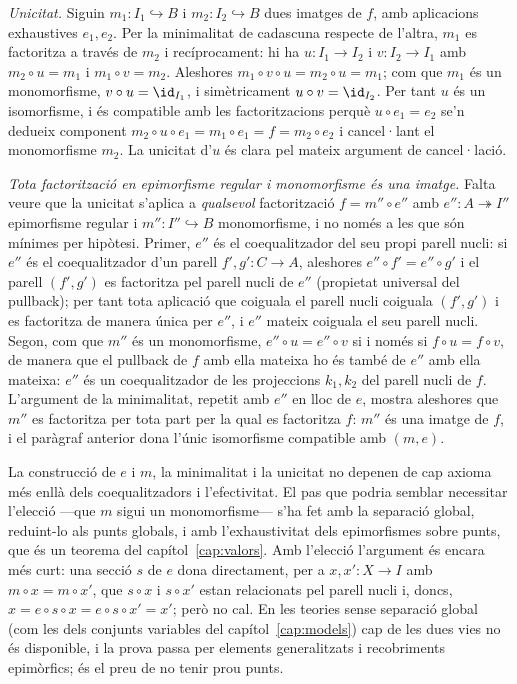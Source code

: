 \begin{prova}
\emph{Unicitat.} Siguin \(m_1\colon I_1\hookrightarrow B\) i
\(m_2\colon I_2\hookrightarrow B\) dues imatges de \(f\), amb aplicacions
exhaustives \(e_1,e_2\). Per la minimalitat de cadascuna respecte de
l'altra, \(m_1\) es factoritza a través de \(m_2\) i recíprocament: hi ha
\(u\colon I_1\to I_2\) i \(v\colon I_2\to I_1\) amb \(m_2\circ u=m_1\) i
\(m_1\circ v=m_2\). Aleshores \(m_1\circ v\circ u=m_2\circ u=m_1\); com
que \(m_1\) és un monomorfisme, \(v\circ u=\id_{I_1}\), i simètricament
\(u\circ v=\id_{I_2}\). Per tant \(u\) és un isomorfisme, i és compatible
amb les factoritzacions perquè \(u\circ e_1=e_2\) se'n dedueix component
\(m_2\circ u\circ e_1=m_1\circ e_1=f=m_2\circ e_2\) i cancel·lant el
monomorfisme \(m_2\). La unicitat d'\(u\) és clara pel mateix argument de
cancel·lació.

\emph{Tota factorització en epimorfisme regular i monomorfisme és una
imatge.} Falta veure que la unicitat s'aplica a \emph{qualsevol}
factorització \(f=m''\circ e''\) amb \(e''\colon A\twoheadrightarrow I''\)
epimorfisme regular i \(m''\colon I''\hookrightarrow B\) monomorfisme, i no
només a les que són mínimes per hipòtesi. Primer, \(e''\) és el
coequalitzador del seu propi parell nucli: si \(e''\) és el coequalitzador
d'un parell \(f',g'\colon C\to A\), aleshores \(e''\circ f'=e''\circ g'\) i
el parell \((f',g')\) es factoritza pel parell nucli de \(e''\) (propietat
universal del pullback); per tant tota aplicació que coiguala el parell
nucli coiguala \((f',g')\) i es factoritza de manera única per \(e''\), i
\(e''\) mateix coiguala el seu parell nucli. Segon, com que \(m''\) és un
monomorfisme, \(e''\circ u=e''\circ v\) si i només si \(f\circ u=f\circ v\),
de manera que el pullback de \(f\) amb ella mateixa ho és també de \(e''\)
amb ella mateixa: \(e''\) és un coequalitzador de les projeccions
\(k_1,k_2\) del parell nucli de \(f\). L'argument de la minimalitat,
repetit amb \(e''\) en lloc de \(e\), mostra aleshores que \(m''\) es
factoritza per tota part per la qual es factoritza \(f\): \(m''\) és una
imatge de \(f\), i el paràgraf anterior dona l'únic isomorfisme compatible
amb \((m,e)\).
\end{prova}

\begin{observacio}\label{obs:factoritzacio-eleccio}
La construcció de \(e\) i \(m\), la minimalitat i la unicitat no depenen
de cap axioma més enllà dels coequalitzadors i l'efectivitat. El pas que
podria semblar necessitar l'elecció ---que \(m\) sigui un monomorfisme---
s'ha fet amb la separació global, reduint-lo als punts globals, i amb
l'exhaustivitat dels epimorfismes sobre punts, que és un teorema del
capítol~\ref{cap:valors}. Amb l'elecció l'argument és encara més curt:
una secció \(s\) de \(e\) dona directament, per a \(x,x'\colon X\to I\)
amb \(m\circ x=m\circ x'\), que \(s\circ x\) i \(s\circ x'\) estan
relacionats pel parell nucli i, doncs, \(x=e\circ s\circ x=e\circ s\circ
x'=x'\); però no cal. En les teories sense separació global (com les
dels conjunts variables del capítol~\ref{cap:models}) cap de les dues
vies no és disponible, i la prova passa per elements generalitzats i
recobriments epimòrfics; és el preu de no tenir prou punts.
\end{observacio}

